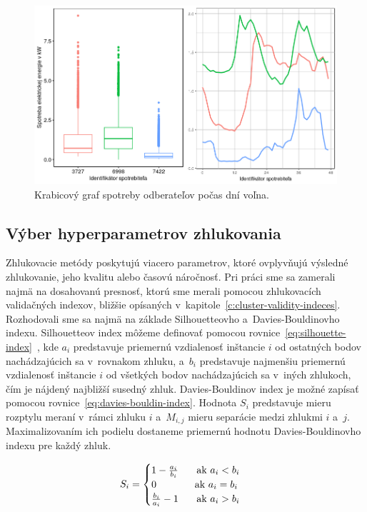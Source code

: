 \documentclass[a4paper,twoside,slovak,12pt,appendix]{article}
\begin{document}
\begin{figure}[htbp]
  \centering
  \includegraphics[width=\textwidth]{holidays_plot.png}
  \caption{Krabicový graf spotreby odberateľov počas dní voľna.}
  \label{fig:holidays-plot}
\end{figure}

\subsection{Výber hyperparametrov zhlukovania}
\label{c:hyperparameter-selection}
Zhlukovacie metódy poskytujú viacero parametrov, ktoré ovplyvňujú výsledné
zhlukovanie, jeho kvalitu alebo časovú náročnosť. Pri práci sme sa zamerali
najmä na dosahovanú presnosť, ktorú sme merali pomocou zhlukovacích validačných
indexov, bližšie opísaných v~kapitole~\ref{c:cluster-validity-indeces}.
Rozhodovali sme sa najmä na základe Silhouetteovho a~Davies-Bouldinovho indexu.
Silhouetteov index môžeme definovať pomocou
rovnice~\ref{eq:silhouette-index}~\cite{Arbelaitz2013}, kde $a_i$ predstavuje
priemernú vzdialenosť inštancie $i$ od ostatných bodov nachádzajúcich sa
v~rovnakom zhluku, a~$b_i$ predstavuje najmenšiu priemernú vzdialenosť inštancie
$i$ od všetkých bodov nachádzajúcich sa v~iných zhlukoch, čím je nájdený
najbližší susedný zhluk. Davies-Bouldinov index je možné zapísať pomocou
rovnice~\ref{eq:davies-bouldin-index}\cite{Arbelaitz2013}. Hodnota $S_i$
predstavuje mieru rozptylu meraní v~rámci zhluku $i$ a~$M_{i, j}$ mieru
separácie medzi zhlukmi $i$ a~$j$. Maximalizovaním ich podielu dostaneme
priemernú hodnotu Davies-Bouldinovho indexu pre každý zhluk.

\begin{equation}
  \label{eq:silhouette-index}
  S_i =
  \begin{cases}
    1 - \frac{a_i}{b_i} \indent \text{ ak } a_i < b_i \\
    0                   \indent \indent \hphantom{a} \text{ ak } a_i = b_i \\
    \frac{b_i}{a_i} - 1 \indent \text{ ak } a_i > b_i \\
  \end{cases}
\end{equation}
\end{document}
